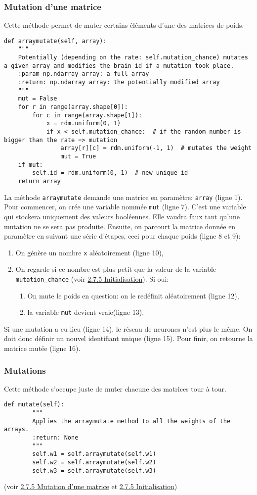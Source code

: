 \documentclass[12pt, a4paper, openany]{book}
\begin{document}
\subsubsection{Mutation d'une matrice}
\label{r:2.7.5-mat}
Cette méthode permet de muter certains éléments d'une des matrices de poids.
\begin{verbatim}
def arraymutate(self, array):
    """
    Potentially (depending on the rate: self.mutation_chance) mutates a given array and modifies the brain id if a mutation took place.
    :param np.ndarray array: a full array
    :return: np.ndarray array: the potentially modified array
    """
    mut = False
    for r in range(array.shape[0]):
        for c in range(array.shape[1]):
            x = rdm.uniform(0, 1)
            if x < self.mutation_chance:  # if the random number is bigger than the rate => mutation
                array[r][c] = rdm.uniform(-1, 1)  # mutates the weight
                mut = True
    if mut:
        self.id = rdm.uniform(0, 1)  # new unique id
    return array
\end{verbatim}
La méthode \verb'arraymutate' demande une matrice en paramètre: \verb'array' (ligne 1). Pour commencer, on crée une variable nommée \verb'mut' (ligne 7). C'est une variable qui stockera uniquement des valeurs booléennes. Elle vaudra \og{}faux\fg{} tant qu'une mutation ne se sera pas produite. Ensuite, on parcourt la matrice donnée en paramètre en suivant une série d'étapes, ceci pour chaque poids (ligne 8 et 9):
\begin{enumerate}
	\item On génère un nombre \verb'x' aléatoirement (ligne 10),
	\item On regarde si ce nombre est plus petit que la valeur de la variable \verb'mutation_chance' (voir \hyperref[r:2.7.5-ini]{2.7.5 Initialisation}). Si oui:
	\begin{enumerate}
		\item On \og{}mute\fg{} le poids en question: on le redéfinit aléatoirement (ligne 12),
		\item la variable \verb'mut' devient \og{}vraie\fg{}(ligne 13).
	\end{enumerate}
\end{enumerate}
Si une mutation a eu lieu (ligne 14), le réseau de neurones n'est plus le même. On doit donc définir un nouvel identifiant unique (ligne 15). Pour finir, on retourne la matrice mutée (ligne 16).

\subsubsection{Mutations}
Cette méthode s'occupe juste de muter chacune des matrices tour à tour.
\begin{verbatim}
def mutate(self):
        """
        Applies the arraymutate method to all the weights of the arrays.
        :return: None
        """
        self.w1 = self.arraymutate(self.w1)
        self.w2 = self.arraymutate(self.w2)
        self.w3 = self.arraymutate(self.w3)
\end{verbatim}
(voir \hyperref[r:2.7.5-mat]{2.7.5 Mutation d'une matrice} et \hyperref[r:2.7.5-ini]{2.7.5 Initialisation})
\end{document}
